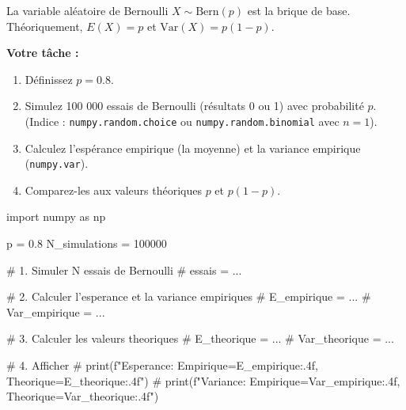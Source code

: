 \begin{exercicebox}
La variable aléatoire de Bernoulli $X \sim \text{Bern}(p)$ est la brique de base. Théoriquement, $E(X) = p$ et $\text{Var}(X) = p(1-p)$.

\textbf{Votre tâche :}
\begin{enumerate}
    \item Définissez $p=0.8$.
    \item Simulez 100 000 essais de Bernoulli (résultats 0 ou 1) avec probabilité $p$. (Indice : \texttt{numpy.random.choice} ou \texttt{numpy.random.binomial} avec $n=1$).
    \item Calculez l'espérance empirique (la moyenne) et la variance empirique (\texttt{numpy.var}).
    \item Comparez-les aux valeurs théoriques $p$ et $p(1-p)$.
\end{enumerate}

\begin{codecell}
import numpy as np

p = 0.8
N_simulations = 100000

# 1. Simuler N essais de Bernoulli
# essais = ...

# 2. Calculer l'esperance et la variance empiriques
# E_empirique = ...
# Var_empirique = ...

# 3. Calculer les valeurs theoriques
# E_theorique = ...
# Var_theorique = ...

# 4. Afficher
# print(f"Esperance: Empirique={E_empirique:.4f}, Theorique={E_theorique:.4f}")
# print(f"Variance:  Empirique={Var_empirique:.4f}, Theorique={Var_theorique:.4f}")
\end{codecell}
\end{exercicebox}